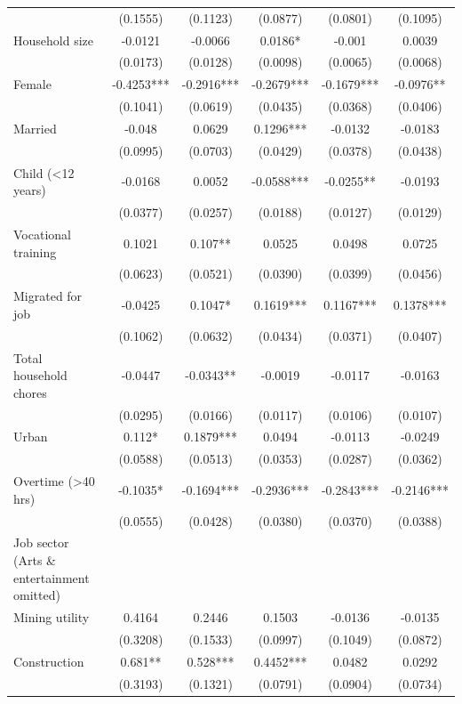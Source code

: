 \begin{table}[htbp]
{\begin{tabular}{lccccc}
		& (0.1555) & (0.1123) & (0.0877) & (0.0801) & (0.1095) \\
\addlinespace
		Household size & -0.0121 & -0.0066 & 0.0186* & -0.001 & 0.0039 \\
		& (0.0173) & (0.0128) & (0.0098) & (0.0065) & (0.0068) \\
		Female & -0.4253*** & -0.2916*** & -0.2679*** & -0.1679*** & -0.0976** \\
		& (0.1041) & (0.0619) & (0.0435) & (0.0368) & (0.0406) \\
		Married & -0.048 & 0.0629 & 0.1296*** & -0.0132 & -0.0183 \\
		& (0.0995) & (0.0703) & (0.0429) & (0.0378) & (0.0438) \\
		Child (<12 years) & -0.0168 & 0.0052 & -0.0588*** & -0.0255** & -0.0193 \\
		& (0.0377) & (0.0257) & (0.0188) & (0.0127) & (0.0129) \\
		Vocational training & 0.1021 & 0.107** & 0.0525 & 0.0498 & 0.0725 \\
		& (0.0623) & (0.0521) & (0.0390) & (0.0399) & (0.0456) \\
		Migrated for job & -0.0425 & 0.1047* & 0.1619*** & 0.1167*** & 0.1378*** \\
		& (0.1062) & (0.0632) & (0.0434) & (0.0371) & (0.0407) \\
		Total household chores & -0.0447 & -0.0343** & -0.0019 & -0.0117 & -0.0163 \\
		& (0.0295) & (0.0166) & (0.0117) & (0.0106) & (0.0107) \\
		Urban & 0.112* & 0.1879*** & 0.0494 & -0.0113 & -0.0249 \\
		& (0.0588) & (0.0513) & (0.0353) & (0.0287) & (0.0362) \\
		Overtime (>40 hrs) & -0.1035* & -0.1694*** & -0.2936*** & -0.2843*** & -0.2146*** \\
		& (0.0555) & (0.0428) & (0.0380) & (0.0370) & (0.0388) \\
Job sector (Arts \& entertainment omitted) &&&&& \\
\hspace{1em} Mining utility & 0.4164 & 0.2446 & 0.1503 & -0.0136 & -0.0135 \\
		& (0.3208) & (0.1533) & (0.0997) & (0.1049) & (0.0872) \\
\hspace{1em} Construction & 0.681** & 0.528*** & 0.4452*** & 0.0482 & 0.0292 \\
		& (0.3193) & (0.1321) & (0.0791) & (0.0904) & (0.0734) \\

\end{tabular}}
\end{table}

